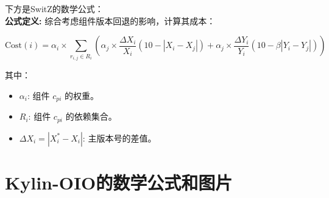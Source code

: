 \documentclass{article}
\begin{document}
下方是SwitZ的数学公式：\\


\textbf{公式定义:} 综合考虑组件版本回退的影响，计算其成本：

$$
\text{Cost}(i) = \alpha_i \times \sum_{r_{i,j} \in R_i} \left( \alpha_j \times \frac{\Delta X_i}{X_i} (10 - |X_i - X_j|) + \alpha_j \times \frac{\Delta Y_i}{Y_i} (10 - \beta |Y_i - Y_j|) \right)
$$

其中：

\begin{itemize}
  \item $\alpha_i$: 组件 $c_{pi}$ 的权重。
  \item $R_i$: 组件 $c_{pi}$ 的依赖集合。
  \item $\Delta X_i = |X_i^* - X_i|$: 主版本号的差值。
\end{itemize}


\section{Kylin-OIO的数学公式和图片}
\end{document}
